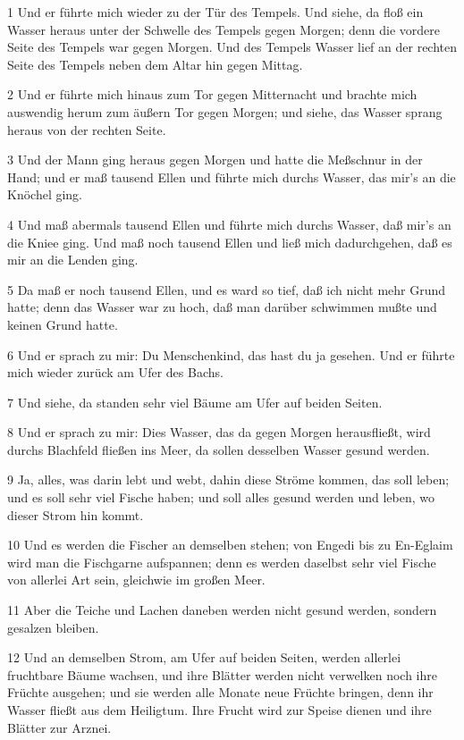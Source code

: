 \par 1 Und er führte mich wieder zu der Tür des Tempels. Und siehe, da floß ein Wasser heraus unter der Schwelle des Tempels gegen Morgen; denn die vordere Seite des Tempels war gegen Morgen. Und des Tempels Wasser lief an der rechten Seite des Tempels neben dem Altar hin gegen Mittag.
\par 2 Und er führte mich hinaus zum Tor gegen Mitternacht und brachte mich auswendig herum zum äußern Tor gegen Morgen; und siehe, das Wasser sprang heraus von der rechten Seite.
\par 3 Und der Mann ging heraus gegen Morgen und hatte die Meßschnur in der Hand; und er maß tausend Ellen und führte mich durchs Wasser, das mir's an die Knöchel ging.
\par 4 Und maß abermals tausend Ellen und führte mich durchs Wasser, daß mir's an die Kniee ging. Und maß noch tausend Ellen und ließ mich dadurchgehen, daß es mir an die Lenden ging.
\par 5 Da maß er noch tausend Ellen, und es ward so tief, daß ich nicht mehr Grund hatte; denn das Wasser war zu hoch, daß man darüber schwimmen mußte und keinen Grund hatte.
\par 6 Und er sprach zu mir: Du Menschenkind, das hast du ja gesehen. Und er führte mich wieder zurück am Ufer des Bachs.
\par 7 Und siehe, da standen sehr viel Bäume am Ufer auf beiden Seiten.
\par 8 Und er sprach zu mir: Dies Wasser, das da gegen Morgen herausfließt, wird durchs Blachfeld fließen ins Meer, da sollen desselben Wasser gesund werden.
\par 9 Ja, alles, was darin lebt und webt, dahin diese Ströme kommen, das soll leben; und es soll sehr viel Fische haben; und soll alles gesund werden und leben, wo dieser Strom hin kommt.
\par 10 Und es werden die Fischer an demselben stehen; von Engedi bis zu En-Eglaim wird man die Fischgarne aufspannen; denn es werden daselbst sehr viel Fische von allerlei Art sein, gleichwie im großen Meer.
\par 11 Aber die Teiche und Lachen daneben werden nicht gesund werden, sondern gesalzen bleiben.
\par 12 Und an demselben Strom, am Ufer auf beiden Seiten, werden allerlei fruchtbare Bäume wachsen, und ihre Blätter werden nicht verwelken noch ihre Früchte ausgehen; und sie werden alle Monate neue Früchte bringen, denn ihr Wasser fließt aus dem Heiligtum. Ihre Frucht wird zur Speise dienen und ihre Blätter zur Arznei.
